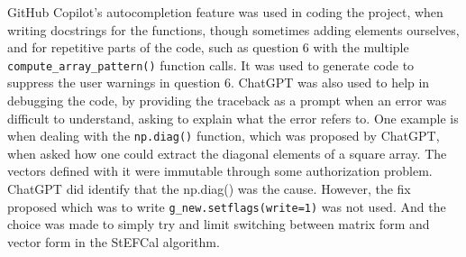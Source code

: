 \documentclass[12pt]{report} %
\begin{document}
GitHub Copilot's autocompletion feature was used in coding the project, when writing docstrings for the functions, though sometimes adding elements ourselves, and for repetitive parts of the code, such as question 6 with the multiple \texttt{compute\_array\_pattern()} function calls. It was used to generate code to suppress the user warnings in question 6.
ChatGPT was also used to help in debugging the code, by providing the traceback as a prompt when an error was difficult to understand, asking to explain what the error refers to. One example is when dealing with the \texttt{np.diag()} function, which was proposed by ChatGPT, when asked how one could extract the diagonal elements of a square array. The vectors defined with it were immutable through some authorization problem. ChatGPT did identify that the np.diag() was the cause. However, the fix proposed which was to write \texttt{g\_new.setflags(write=1)} was not used. And the choice was made to simply try and limit switching between matrix form and vector form in the StEFCal algorithm.







\end{document}
